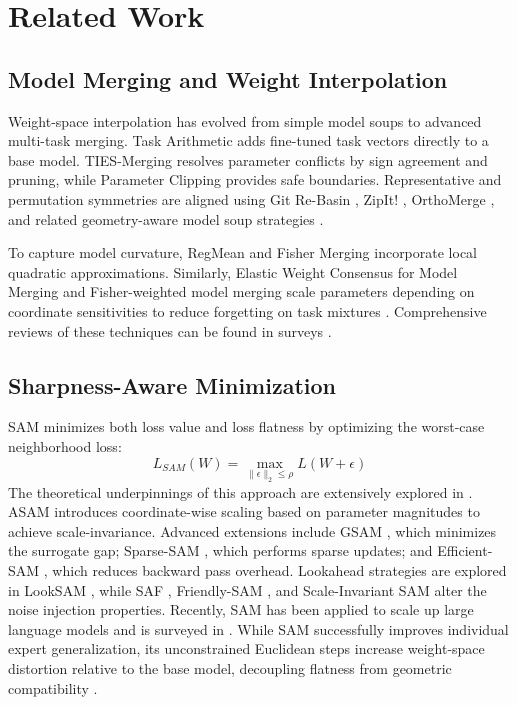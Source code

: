 \documentclass{article}
\theoremstyle{plain}
\theoremstyle{definition}
\theoremstyle{remark}
\begin{document}
\section{Related Work}
\label{sec:related}

\subsection{Model Merging and Weight Interpolation}
Weight-space interpolation has evolved from simple model soups \cite{wortsman22} to advanced multi-task merging. Task Arithmetic \cite{ilharco22} adds fine-tuned task vectors directly to a base model. TIES-Merging \cite{yadav23} resolves parameter conflicts by sign agreement and pruning, while Parameter Clipping \cite{yang2024clipping} provides safe boundaries. Representative and permutation symmetries are aligned using Git Re-Basin \cite{ainsworth2022git}, ZipIt! \cite{stoica2023zip}, OrthoMerge \cite{spor25}, and related geometry-aware model soup strategies \cite{guerry2024geometry,marconi2024papas} \cite{ott2024robust}.

To capture model curvature, RegMean \cite{jin2022regmean} and Fisher Merging \cite{matena2022merging} incorporate local quadratic approximations. Similarly, Elastic Weight Consensus for Model Merging \cite{daheim2023elastic} and Fisher-weighted model merging \cite{lim2024fisher} \cite{ponti2023parameter} scale parameters depending on coordinate sensitivities to reduce forgetting on task mixtures \cite{choshen2022fusing,yu2023language}. Comprehensive reviews of these techniques can be found in surveys \cite{lu24,tang2024merging}.

\subsection{Sharpness-Aware Minimization}
SAM \cite{foret21} minimizes both loss value and loss flatness by optimizing the worst-case neighborhood loss:
\begin{equation}
    L_{SAM}(W) = \max_{\|\epsilon\|_2 \le \rho} L(W + \epsilon)
\end{equation}
The theoretical underpinnings of this approach are extensively explored in \cite{andriushchenko2022understanding}. ASAM \cite{kwon21} introduces coordinate-wise scaling based on parameter magnitudes to achieve scale-invariance. Advanced extensions include GSAM \cite{zhuang2022surrogate}, which minimizes the surrogate gap; Sparse-SAM \cite{mi2022make}, which performs sparse updates; and Efficient-SAM \cite{du2022efficient}, which reduces backward pass overhead. Lookahead strategies are explored in LookSAM \cite{liu2022towards}, while SAF \cite{wen2023penalizing}, Friendly-SAM \cite{jeon2024friendly}, and Scale-Invariant SAM \cite{kim2024scale} alter the noise injection properties. Recently, SAM has been applied to scale up large language models \cite{muller2024sharpness} and is surveyed in \cite{zhao2024sam}. While SAM successfully improves individual expert generalization, its unconstrained Euclidean steps increase weight-space distortion relative to the base model, decoupling flatness from geometric compatibility \cite{spor25}.
\end{document}
